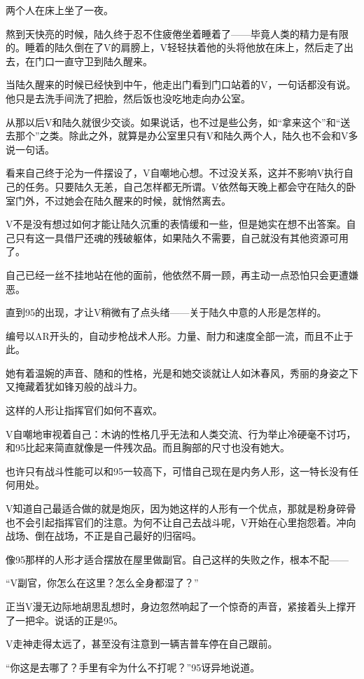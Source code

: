 两个人在床上坐了一夜。

熬到天快亮的时候，陆久终于忍不住疲倦坐着睡着了——毕竟人类的精力是有限的。睡着的陆久倒在了V的肩膀上，V轻轻扶着他的头将他放在床上，然后走了出去，在门口一直守卫到陆久醒来。

当陆久醒来的时候已经快到中午，他走出门看到门口站着的V，一句话都没有说。他只是去洗手间洗了把脸，然后饭也没吃地走向办公室。

从那以后V和陆久就很少交谈。如果说话，也不过是些公务，如“拿来这个”和“送去那个”之类。除此之外，就算是办公室里只有V和陆久两个人，陆久也不会和V多说一句话。

看来自己终于沦为一件摆设了，V自嘲地心想。不过没关系，这并不影响V执行自己的任务。只要陆久无恙，自己怎样都无所谓。V依然每天晚上都会守在陆久的卧室门外，不过她会在陆久醒来的时候，就悄然离去。

V不是没有想过如何才能让陆久沉重的表情缓和一些，但是她实在想不出答案。自己只有这一具借尸还魂的残破躯体，如果陆久不需要，自己就没有其他资源可用了。

自己已经一丝不挂地站在他的面前，他依然不屑一顾，再主动一点恐怕只会更遭嫌恶。

直到95的出现，才让V稍微有了点头绪——关于陆久中意的人形是怎样的。

编号以AR开头的，自动步枪战术人形。力量、耐力和速度全部一流，而且不止于此。

她有着温婉的声音、随和的性格，光是和她交谈就让人如沐春风，秀丽的身姿之下又掩藏着犹如锋刃般的战斗力。

这样的人形让指挥官们如何不喜欢。

V自嘲地审视着自己：木讷的性格几乎无法和人类交流、行为举止冷硬毫不讨巧，和95比起来简直就像是一件残次品。而且胸部的尺寸也没有她大。

也许只有战斗性能可以和95一较高下，可惜自己现在是内务人形，这一特长没有任何用处。

V知道自己最适合做的就是炮灰，因为她这样的人形有一个优点，那就是粉身碎骨也不会引起指挥官们的注意。为何不让自己去战斗呢，V开始在心里抱怨着。冲向战场、倒在战场，不正是自己最好的归宿吗。

像95那样的人形才适合摆放在屋里做副官。自己这样的失败之作，根本不配——

“V副官，你怎么在这里？怎么全身都湿了？”

正当V漫无边际地胡思乱想时，身边忽然响起了一个惊奇的声音，紧接着头上撑开了一把伞。说话的正是95。

V走神走得太远了，甚至没有注意到一辆吉普车停在自己跟前。

“你这是去哪了？手里有伞为什么不打呢？”95讶异地说道。

